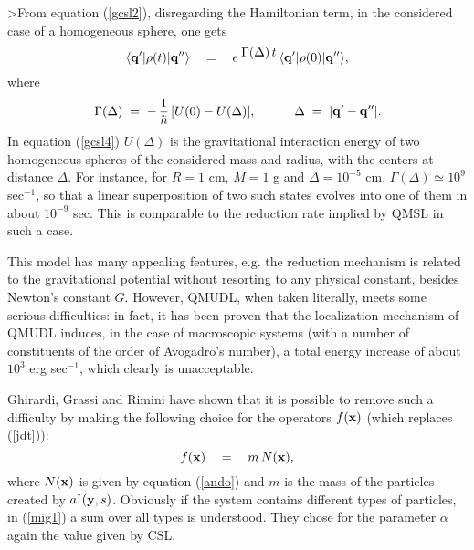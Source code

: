 \documentclass[10pt,a4paper]{article}
\begin{document}
>From equation (\ref{gcsl2}), disregarding the Hamiltonian term, in
the considered case of a homogeneous sphere, one gets
\begin{equation} \label{gcsl3}
\langle {\bf q}'| \rho(t) |{\bf q}''\rangle \quad = \quad e^{\;
\displaystyle \Gamma(\Delta)\, t}\, \langle {\bf q}'| \rho(0)
|{\bf q}''\rangle,
\end{equation}
where
\begin{equation} \label{gcsl4}
\Gamma(\Delta) \; = \; -\, \frac{1}{\hbar}\, [U(0) - U(\Delta)],
\qquad\quad \Delta \; = \; |{\bf q}' - {\bf q}''|.
\end{equation}
In equation (\ref{gcsl4}) $U(\Delta)$ is the gravitational
interaction energy of two homogeneous spheres of the considered
mass and radius, with the centers at distance $\Delta$. For
instance, for $R = 1$ cm, $M = 1$ g and $\Delta = 10^{-5}$ cm,
$\Gamma(\Delta) \simeq 10^{9}$ sec$^{-1}$, so that a linear
superposition of two such states evolves into one of them in about
$10^{-9}$ sec.  This is comparable to the reduction rate implied by QMSL
in such a case.

This model has many appealing features, e.g. the reduction
mechanism is related to the gravitational potential without
resorting to any physical constant, besides Newton's constant $G$.
However, QMUDL, when taken literally, meets some serious
difficulties: in fact, it has been proven \cite{ggrg} that the
localization mechanism of QMUDL induces, in the case of
macroscopic systems (with a number of constituents of the order of
Avogadro's number), a total energy increase of about $10^{3}$ erg
sec${}^{-1}$, which clearly is unacceptable.

Ghirardi, Grassi and Rimini \cite{ggrg} have shown that it is
possible to remove such a difficulty by making the following
choice for the operators $f({\bf x})$ (which replaces
(\ref{jdt})):
\begin{equation} \label{mig1}
f({\bf x}) \quad = \quad m\, N({\bf x}),
\end{equation}
where $N({\bf x})$ is given by equation (\ref{ando}) and $m$ is
the mass of the particles created by $a^{\dagger}({\bf y},s)$.
Obviously if the system contains different types of particles, in
(\ref{mig1}) a sum over all types is understood. They chose for
the parameter $\alpha$ again the value given by CSL.
\end{document}
